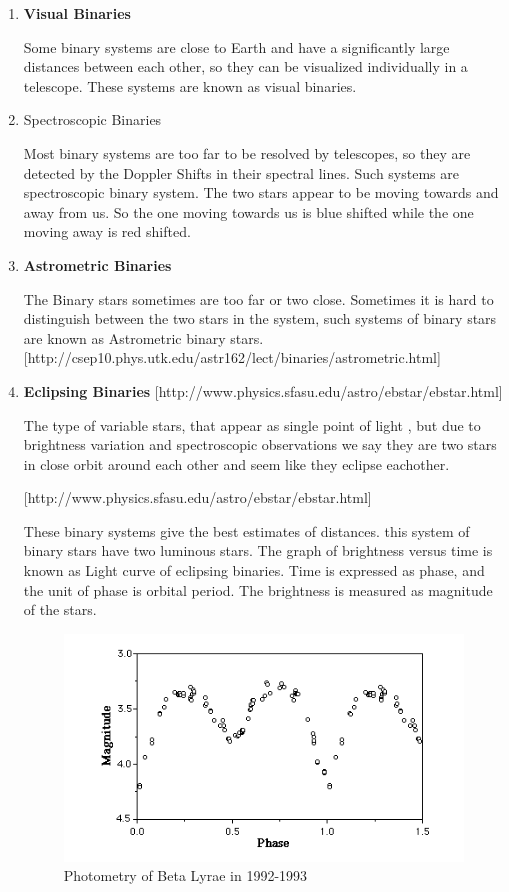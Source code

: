 \begin{enumerate}

\item\textbf{Visual Binaries}

Some binary systems are close to Earth and have a significantly large distances between each    other, so they can be visualized individually in a telescope. These systems are known as visual binaries.

\item {Spectroscopic Binaries }

Most binary systems are too far to be resolved by telescopes, so they are detected by the Doppler Shifts in their spectral lines. Such systems are spectroscopic binary system. The two stars appear to be moving towards and away from us. So the one moving towards us is blue shifted while the one moving away is red shifted.


\item\textbf{Astrometric Binaries}

The Binary stars sometimes are too far or two close. Sometimes it is hard to distinguish between the two stars in the system, such systems of binary stars are known as Astrometric binary stars.
[http://csep10.phys.utk.edu/astr162/lect/binaries/astrometric.html]

\item \textbf{Eclipsing Binaries}
[http://www.physics.sfasu.edu/astro/ebstar/ebstar.html]

The type of variable stars, that appear as single point of light , but due to brightness variation and spectroscopic observations we say they are two stars in close orbit around each other and seem like they eclipse eachother.

[http://www.physics.sfasu.edu/astro/ebstar/ebstar.html]

These binary systems give the best estimates of distances. this system of binary stars have two luminous stars. The graph of brightness versus time is known as Light curve of eclipsing binaries. Time is expressed as phase, and the unit of phase is orbital period. The brightness is measured as magnitude of the stars.
\begin{figure}
\centering
\includegraphics[scale=0.5]{LC}
\caption{Photometry of Beta Lyrae in 1992-1993}
\end{figure}

\end{enumerate}

